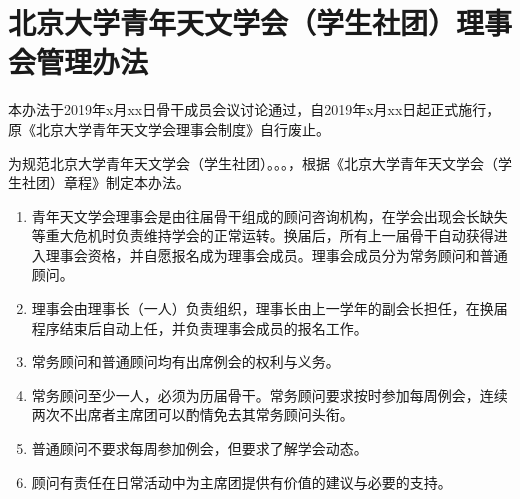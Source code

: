 \chapter{北京大学青年天文学会（学生社团）理事会管理办法}

本办法于2019年x月xx日骨干成员会议讨论通过，自2019年x月xx日起正式施行，原《北京大学青年天文学会理事会制度》自行废止。

为规范北京大学青年天文学会（学生社团）。。。，根据《北京大学青年天文学会（学生社团）章程》制定本办法。

\begin{enumerate}
    \item 青年天文学会理事会是由往届骨干组成的顾问咨询机构，在学会出现会长缺失等重大危机时负责维持学会的正常运转。换届后，所有上一届骨干自动获得进入理事会资格，并自愿报名成为理事会成员。理事会成员分为常务顾问和普通顾问。
    
    \item 理事会由理事长（一人）负责组织，理事长由上一学年的副会长担任，在换届程序结束后自动上任，并负责理事会成员的报名工作。
    
    \item 常务顾问和普通顾问均有出席例会的权利与义务。
    
    \item 常务顾问至少一人，必须为历届骨干。常务顾问要求按时参加每周例会，连续两次不出席者主席团可以酌情免去其常务顾问头衔。
    
    \item 普通顾问不要求每周参加例会，但要求了解学会动态。
    
    \item 顾问有责任在日常活动中为主席团提供有价值的建议与必要的支持。
\end{enumerate}
